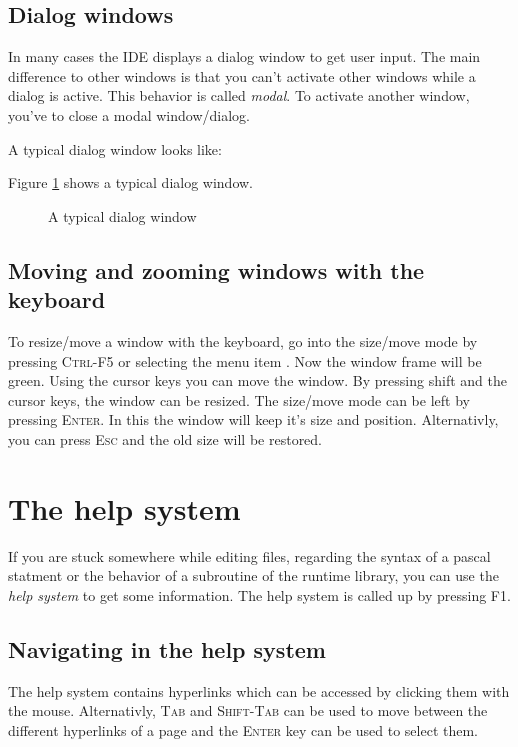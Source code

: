 \subsection{Dialog windows}
\label{ide:dialogwindow}
In many cases the IDE displays a dialog window to get user input.
The main difference to other windows is that you can't activate
other windows while a dialog is active. This behavior is called
\emph{modal}. To activate another window, you've to close
a modal window/dialog.

\begin{htmlonly}
A typical dialog window looks like:
\end{htmlonly}
\begin{latexonly}
Figure \ref{fig:idedlg} shows a typical dialog window.
\begin{figure}
\caption{A typical dialog window}
\label{fig:idedlg}
\ifpdf
{}
\else
\fi
\end{figure}
\end{latexonly}

\subsection{Moving and zooming windows with the keyboard}
\label{ide:keyboardwindow}
To resize/move a window with the keyboard, go into the size/move mode
by pressing \textsc{Ctrl-F5} or selecting the menu item
. Now the window frame will be green. Using the
cursor keys you can move the window. By pressing shift and the cursor
keys, the window can be resized. The size/move mode can be left by pressing
\textsc{Enter}. In this the window will keep it's size and position.
Alternativly, you can press \textsc{Esc} and the old size will be restored.

\section{The help system}
If you are stuck somewhere while editing files, regarding the syntax
of a pascal statment or the behavior of a subroutine of the runtime
library, you can use the \emph{help system} to get some information. The
help system is called up by pressing F1.

\subsection{Navigating in the help system}
The help system contains hyperlinks which can be accessed by clicking
them with the mouse. Alternativly, \textsc{Tab} and \textsc{Shift-Tab}
can be used to move between the different hyperlinks of a page
and the \textsc{Enter} key can be used to select them.


